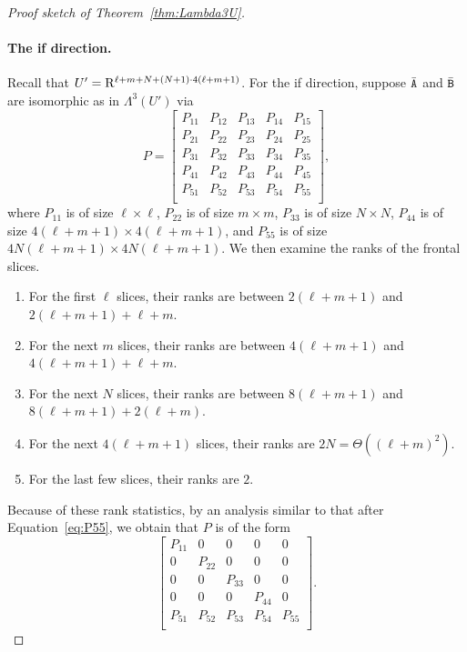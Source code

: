 \begin{proof}[Proof sketch of Theorem~\ref{thm:Lambda3U}]
\paragraph{The if direction.} Recall that $U'=\mathrm{R}^{\ell+m+N+(N+1)\cdot 4(\ell+m+1)}$. For the if direction, suppose $\bar{\mathtt{A}}$ and $\bar{\mathtt{B}}$ are isomorphic as in $\Lambda^3(U')$ via 
$$P=\begin{bmatrix}
	P_{11} & P_{12} & P_{13} & P_{14} & P_{15}\\
	P_{21} & P_{22} & P_{23} & P_{24} & P_{25}\\
	P_{31} & P_{32} & P_{33} & P_{34} & P_{35}\\
	P_{41} & P_{42} & P_{43} & P_{44} & P_{45}\\
	P_{51} & P_{52} & P_{53} & P_{54} & P_{55}\\
\end{bmatrix},$$
where $P_{11}$ is of size $\ell\times \ell$, $P_{22}$ is of size $m\times m$, $P_{33}$ is of size $N\times N$, $P_{44}$ is of size $4(\ell+m+1)\times4(\ell+m+1)$, and $P_{55}$ is of size $4N(\ell+m+1)\times 4N(\ell+m+1)$. We then examine the ranks of the frontal slices.
\begin{enumerate}
	\item For the first $\ell$ slices, their ranks are between $2(\ell+m+1)$ and $2(\ell+m+1)+\ell+m$.
	\item For the next $m$ slices, their ranks are between $4(\ell+m+1)$ and $4(\ell+m+1)+\ell+m$. 
	
	\item For the next $N$ slices, their ranks are between $8(\ell+m+1)$ and $8(\ell+m+1)+2(\ell+m)$.
	
	\item For the next $4(\ell+m+1)$ slices, their ranks are $2N=\Theta((\ell+m)^2)$. 
	
	\item For the last few slices, their ranks are $2$.
\end{enumerate}
Because of these rank statistics, by an analysis similar to that after Equation~\ref{eq:P55}, we obtain that $P$ is of the form 
\begin{equation}\label{eq:P-form}
	\begin{bmatrix}
	P_{11} & 0 & 0 & 0 & 0\\
	0 & P_{22} & 0 & 0 & 0\\
	0 & 0 & P_{33} & 0 & 0\\
	0 & 0 & 0 & P_{44} & 0\\
	P_{51} & P_{52} & P_{53} & P_{54} & P_{55}\\
\end{bmatrix}.
\end{equation}


\end{proof}
